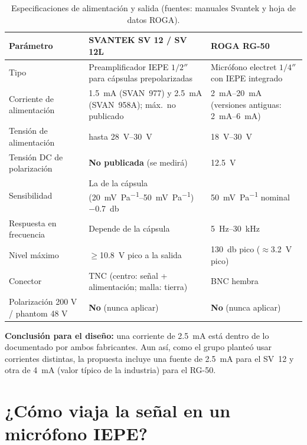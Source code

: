 \documentclass[11pt,a4paper]{article}
\begin{document}
\begin{table}[H]
\centering
\caption{Especificaciones de alimentación y salida (fuentes: manuales Svantek y hoja de datos ROGA).}
\label{tab:mics}
\begin{tabularx}{\textwidth}{lYY}
\toprule
Parámetro & SVANTEK SV 12 / SV 12L & ROGA RG-50 \\
\midrule
Tipo & Preamplificador IEPE $1/2''$ para cápsulas prepolarizadas & Micrófono electret $1/4''$ con IEPE integrado \\
Corriente de alimentación & \SI{1.5}{\milli\ampere} (SVAN~977) y \SI{2.5}{\milli\ampere} (SVAN~958A); máx.\ no publicado & \SIrange{2}{20}{\milli\ampere} (versiones antiguas: \SIrange{2}{6}{\milli\ampere}) \\
Tensión de alimentación & hasta \SI{28}{\volt}--\SI{30}{\volt} & \SIrange{18}{30}{\volt} \\
Tensión DC de polarización & \textbf{No publicada} (se medirá) & \SI{12.5}{\volt} \\
Sensibilidad & La de la cápsula (\SIrange{20}{50}{\milli\volt\per\pascal}) $-$\SI{0.7}{\decibel} & \SI{50}{\milli\volt\per\pascal} nominal \\
Respuesta en frecuencia & Depende de la cápsula & \SI{5}{\hertz}--\SI{30}{\kilo\hertz} \\
Nivel máximo & $\geq$\SI{10.8}{\volt} pico a la salida & \SI{130}{\decibel} pico ($\approx$\SI{3.2}{\volt} pico) \\
Conector & TNC (centro: señal + alimentación; malla: tierra) & BNC hembra \\
Polarización 200 V / phantom 48 V & \textbf{No} (nunca aplicar) & \textbf{No} (nunca aplicar) \\
\bottomrule
\end{tabularx}
\end{table}

\textbf{Conclusión para el diseño:} una corriente de \SI{2.5}{\milli\ampere} está dentro de lo documentado por ambos
fabricantes. Aun así, como el grupo planteó usar corrientes distintas, la propuesta incluye una fuente de
\SI{2.5}{\milli\ampere} para el SV~12 y otra de \SI{4}{\milli\ampere} (valor típico de la industria) para el RG-50.

\section{¿Cómo viaja la señal en un micrófono IEPE?}
\label{sec:iepe}
\end{document}
